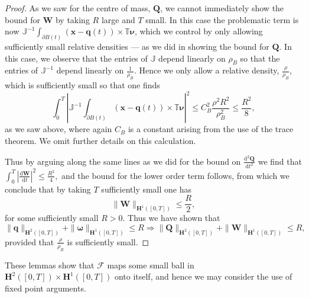 \documentclass[a4paper]{amsart}
\numberwithin{equation}{section}
\theoremstyle{plain}
\newcommand{\mbf}[1]{\mathbf{#1}}
\newcommand{\mbb}[1]{\mathbb{#1}}
\begin{document}
\begin{proof}
    As we saw for the centre of mass, $\mbf{Q}$, we cannot immediately show the bound for $\mbf{W}$ by taking $R$ large and $T$ small.
    In this case the problematic term is now $\mbb{J}^{-1}\int_{\partial B(t)} (\mbf{x} - \mbf{q}(t)) \times \mbb{T} \boldsymbol{\nu}$, which we control by only allowing sufficiently small relative densities --- as we did in showing the bound for $\mbf{Q}$.
    In this case, we observe that the entries of $\mbb{J}$ depend linearly on $\rho_B$ so that the entries of $\mbb{J}^{-1}$ depend linearly on $\frac{1}{\rho_B}$.
    Hence we only allow a relative density, $\frac{\rho}{\rho_B}$, which is sufficiently small so that one finds
    \[\int_0^{T}\left|\mbb{J}^{-1}\int_{\partial B(t)} (\mbf{x} - \mbf{q}(t)) \times \mbb{T} \boldsymbol{\nu}\right|^2 \leq C_B^2\frac{\rho^2 R^2}{\rho_B^2} \leq \frac{R^2}{8},\]
    as we saw above, where again $C_B$ is a constant arising from the use of the trace theorem.
    We omit further details on this calculation.
    
    Thus by arguing along the same lines as we did for the bound on $\frac{\mathrm{d}^2 \mbf{Q}}{\mathrm{d}t^2}$ we find that \( \int_0^{T} \left| \frac{\mathrm{d} \mbf{W}}{\mathrm{d}t} \right|^2 \leq \frac{R^2}{4}, \)
    and the bound for the lower order term follows, from which we conclude that by taking $T$ sufficiently small one has
    \[ \|\mbf{W}\|_{\mbf{H}^1([0,T])} \leq \frac{R}{2}, \]
    for some sufficiently small $R > 0$.
    Thus we have shown that
    \[ \|\mbf{q}\|_{\mbf{H}^2([0,T])} + \|\boldsymbol{\omega}\|_{\mbf{H}^1([0,T])} \leq R \Rightarrow \|\mbf{Q}\|_{\mbf{H}^2([0,T])} + \|\mbf{W}\|_{\mbf{H}^1([0,T])} \leq R,\]
    provided that $\frac{\rho}{\rho_B}$ is sufficiently small.
\end{proof}
These lemmas show that $\mathscr{F}$ maps some small ball in $\mbf{H}^2([0,T]) \times \mbf{H}^1([0,T])$ onto itself, and hence we may consider the use of fixed point arguments.
\end{document}
